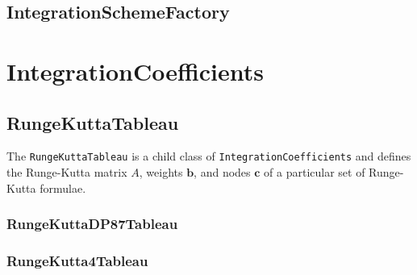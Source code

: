 \subsection{IntegrationSchemeFactory}
\label{sec:IntegrationSchemeFactory}


\section{IntegrationCoefficients}
\label{sec:IntegrationCoefficients}



\subsection{RungeKuttaTableau}
\label{sec:RungeKuttaTableau}

The \texttt{RungeKuttaTableau} is a child class of \texttt{IntegrationCoefficients} and defines the Runge-Kutta matrix $A$, weights $\mathbf{b}$, and nodes $\mathbf{c}$ of a particular set of Runge-Kutta formulae.

\subsubsection{RungeKuttaDP87Tableau}
\label{sec:RungeKuttaTableau}

\subsubsection{RungeKutta4Tableau}
\label{sec:RungeKuttaTableau}


